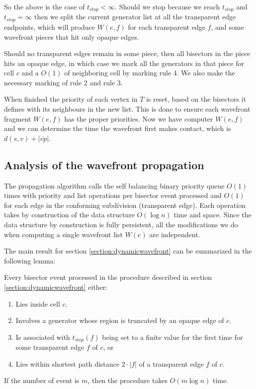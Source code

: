 So the above is the case of $t_{stop} < \infty$. Should we stop because we reach $t_{stop}$ and $t_{stop} = \infty$ then we split the 
current generator list at all the transparent edge endpoints, which will produce $W(e,f)$ for each transparent edge $f$, and some 
wavefront pieces that hit only opaque edges.

Should no transparent edges remain in some piece, then all bisectors in the piece hits an opaque edge, in which case we mark all the 
generators in that piece for cell $c$ and a $O(1)$ of neighboring cell by marking rule 4. We also make the necessary marking of rule 2 
and rule 3.

When finished the priority of each vertex in $T$ is reset, based on the bisectors it defines with its neighbours in the new list. This 
is done to ensure each wavefront fragment $W(e,f)$ has the proper priorities. Now we have computer $W(e,f)$ and we can determine the 
time the wavefront first makes contact, which is $d(s,v)+|\overline{vp}|$.

\subsection{Analysis of the wavefront propagation}

The propagation algorithm calls the self balancing binary priority queue $O(1)$ times with priority and list operations per bisector 
event processed and $O(1)$ for each edge in the conforming subdivision (transparent edge). Each operation takes by construction of the 
data structure $O(\log n)$ time and space. Since the data structure by construction is fully persistent, all the modifications we 
do when computing a single wavefront list $W(e)$ are independent.

The main result for section \ref{section:dynamicwavefront} can be summarized in the following lemma:

\begin{Lemma} 
Every bisector event processed in the procedure described in section \ref{section:dynamicwavefront} either:
\begin{enumerate}
    \item Lies inside cell $c$.
    \item Involves a generator whose region is truncated by an opaque edge of $c$.
    \item Is associated with $t_{stop}(f)$ being set to a finite value for the first time for some transparent edge $f$ of $c$, or
    \item Lies within shortest path distance $2\cdot|f|$ of a transparent edge $f$ of $c$. 
\end{enumerate}
If the number of event is $m$, then the procedure takes $O(m \log n)$ time.
\end{Lemma}

